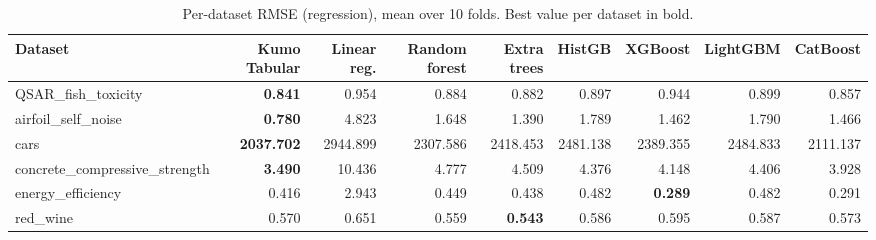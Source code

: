 \begin{table}[h]
\centering
\scriptsize
\setlength{\tabcolsep}{3pt}
\caption{Per-dataset RMSE (regression), mean over 10 folds. Best value per dataset in bold.}
\label{tab:perdataset_regression}
\smallskip
\begin{adjustbox}{max width=\textwidth}
\begin{tabular}{lrrrrrrrr}
\toprule
Dataset & Kumo Tabular & Linear reg. & Random forest & Extra trees & HistGB & XGBoost & LightGBM & CatBoost \\
\midrule
QSAR\_fish\_toxicity & \textbf{0.841} & 0.954 & 0.884 & 0.882 & 0.897 & 0.944 & 0.899 & 0.857 \\
airfoil\_self\_noise & \textbf{0.780} & 4.823 & 1.648 & 1.390 & 1.789 & 1.462 & 1.790 & 1.466 \\
cars & \textbf{2037.702} & 2944.899 & 2307.586 & 2418.453 & 2481.138 & 2389.355 & 2484.833 & 2111.137 \\
concrete\_compressive\_strength & \textbf{3.490} & 10.436 & 4.777 & 4.509 & 4.376 & 4.148 & 4.406 & 3.928 \\
energy\_efficiency & 0.416 & 2.943 & 0.449 & 0.438 & 0.482 & \textbf{0.289} & 0.482 & 0.291 \\
red\_wine & 0.570 & 0.651 & 0.559 & \textbf{0.543} & 0.586 & 0.595 & 0.587 & 0.573 \\
\bottomrule
\end{tabular}
\end{adjustbox}
\end{table}
